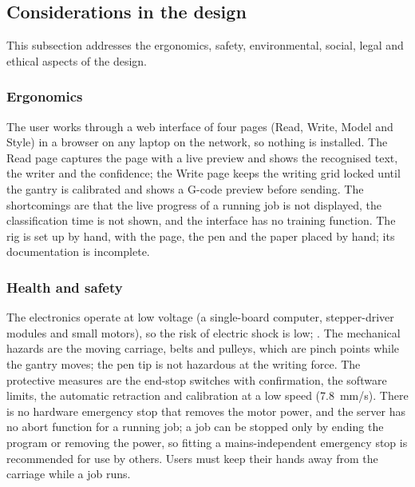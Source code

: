 \subsection{Considerations in the design} %
\label{sec:dis-considerations}

This subsection addresses the ergonomics, safety, environmental, social, legal and ethical aspects of the design.

    \subsubsection{Ergonomics}

        The user works through a web interface of four pages (Read, Write, Model and Style) in a browser on any laptop on the network, so nothing is installed.
        The Read page captures the page with a live preview and shows the recognised text, the writer and the confidence; the Write page keeps the writing grid locked until the gantry is calibrated and shows a G-code preview before sending.
        The shortcomings are that the live progress of a running job is not displayed, the classification time is not shown, and the interface has no training function.
        The rig is set up by hand, with the page, the pen and the paper placed by hand; its documentation is incomplete.

    \subsubsection{Health and safety}

        The electronics operate at low voltage (a single-board computer, stepper-driver modules and small motors), so the risk of electric shock is low; .
        The mechanical hazards are the moving carriage, belts and pulleys, which are pinch points while the gantry moves; the pen tip is not hazardous at the writing force.
        The protective measures are the end-stop switches with confirmation, the software limits, the automatic retraction and calibration at a low speed (7.8~mm/s).
        There is no hardware emergency stop that removes the motor power, and the server has no abort function for a running job; a job can be stopped only by ending the program or removing the power, so fitting a mains-independent emergency stop is recommended for use by others.
        Users must keep their hands away from the carriage while a job runs.

